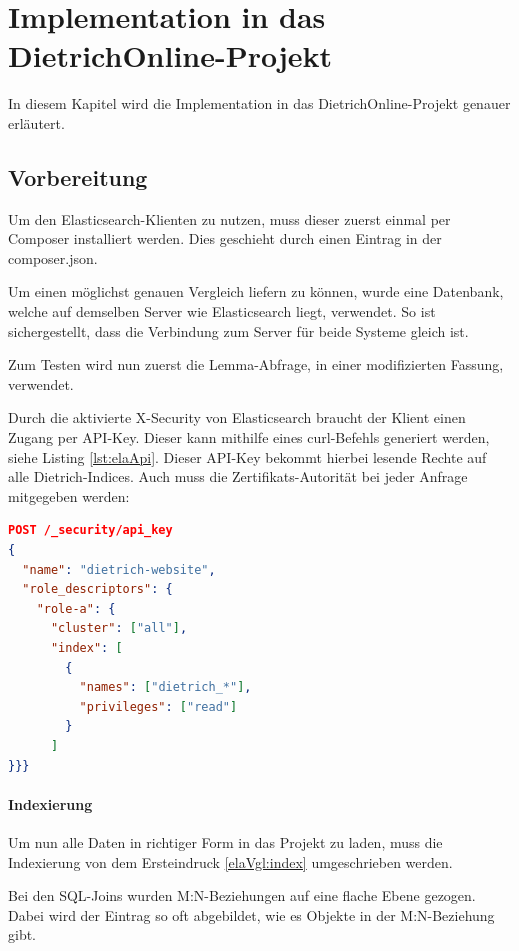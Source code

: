 \chapter{Implementation in das DietrichOnline-Projekt}

In diesem Kapitel wird die Implementation in das DietrichOnline-Projekt genauer erläutert.

\section{Vorbereitung}

Um den Elasticsearch-Klienten zu nutzen, muss dieser zuerst einmal per Composer installiert werden. Dies geschieht durch einen Eintrag in der composer.json.

Um einen möglichst genauen Vergleich liefern zu können, wurde eine Datenbank, welche auf demselben Server wie Elasticsearch liegt, verwendet. So ist sichergestellt, dass die Verbindung zum Server für beide Systeme gleich ist.

Zum Testen wird nun zuerst die Lemma-Abfrage, in einer modifizierten Fassung, verwendet.

Durch die aktivierte X-Security von Elasticsearch braucht der Klient einen Zugang per API-Key. Dieser kann mithilfe eines curl-Befehls generiert werden, siehe Listing \ref{lst:elaApi}. Dieser API-Key bekommt hierbei lesende Rechte auf alle Dietrich-Indices. Auch muss die Zertifikats-Autorität bei jeder Anfrage mitgegeben werden:

\begin{lstlisting}[language=JSON, frame=single, label={lst:elaApi}, caption=Code zur Generierung eines API-Keys,captionpos=b] 
POST /_security/api_key
{
  "name": "dietrich-website",
  "role_descriptors": { 
    "role-a": {
      "cluster": ["all"],
      "index": [
        {
          "names": ["dietrich_*"],
          "privileges": ["read"]
        }
      ]
}}}
\end{lstlisting}


\subsubsection{Indexierung}
\label{lemmaIndexierungEla}

Um nun alle Daten in richtiger Form in das Projekt zu laden, muss die Indexierung von dem Ersteindruck \ref{elaVgl:index} umgeschrieben werden. 

Bei den SQL-Joins wurden M:N-Beziehungen auf eine flache Ebene gezogen. Dabei wird der Eintrag so oft abgebildet, wie es Objekte in der M:N-Beziehung gibt. 

